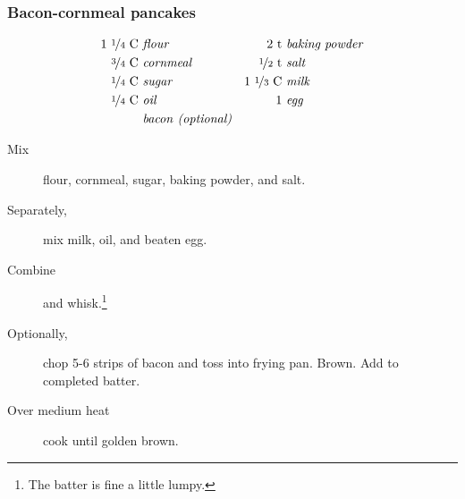 \subsubsection{Bacon-cornmeal pancakes}

\begin{align*}
    \text{1~\nicefrac{1}{4}~C} &~\text{\emph{flour}}  & \text{2~t} &~\text{\emph{baking powder}}        \\
    \text{\nicefrac{3}{4}~C} &~\text{\emph{cornmeal}} & \text{\nicefrac{1}{2}~t} &~\text{\emph{salt}}   \\
    \text{\nicefrac{1}{4}~C} &~\text{\emph{sugar}}    & \text{1~\nicefrac{1}{3}~C} &~\text{\emph{milk}} \\
    \text{\nicefrac{1}{4}~C} &~\text{\emph{oil}}      & \text{1} &~\text{\emph{egg}}                    \\
    \text{} &~\text{\emph{bacon}}~\emph{(optional)}
\end{align*}

\begin{description}
    \item[Mix]flour, cornmeal, sugar, baking powder, and salt.
    \item[Separately,]mix milk, oil, and beaten egg.
    \item[Combine]and whisk.\footnote{The batter is fine a little lumpy.}
    \item[Optionally,]chop 5-6 strips of bacon and toss into frying pan. Brown. Add to completed batter.
    \item[Over medium heat]cook until golden brown.
\end{description}

\pagebreak
